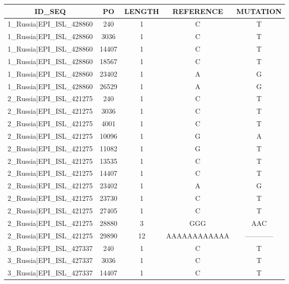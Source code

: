 \documentclass[a4paper,10pt]{article}
\begin{document}
\begin{longtable}{@{}ccccc@{}}
\toprule
\textbf{ID\_SEQ} & \textbf{PO} & \textbf{LENGTH} & \textbf{REFERENCE} & \textbf{MUTATION} \\* \midrule
\endfirsthead
%
\cline{1-5}
\endhead
%
1\_Russia|EPI\_ISL\_428860 & 240 & 1 & C & T \\* \midrule
1\_Russia|EPI\_ISL\_428860 & 3036 & 1 & C & T \\* \midrule
1\_Russia|EPI\_ISL\_428860 & 14407 & 1 & C & T \\* \midrule
1\_Russia|EPI\_ISL\_428860 & 18567 & 1 & C & T \\* \midrule
1\_Russia|EPI\_ISL\_428860 & 23402 & 1 & A & G \\* \midrule
1\_Russia|EPI\_ISL\_428860 & 26529 & 1 & A & G \\* \midrule
2\_Russia|EPI\_ISL\_421275 & 240 & 1 & C & T \\* \midrule
2\_Russia|EPI\_ISL\_421275 & 3036 & 1 & C & T \\* \midrule
2\_Russia|EPI\_ISL\_421275 & 4001 & 1 & C & T \\* \midrule
2\_Russia|EPI\_ISL\_421275 & 10096 & 1 & G & A \\* \midrule
2\_Russia|EPI\_ISL\_421275 & 11082 & 1 & G & T \\* \midrule
2\_Russia|EPI\_ISL\_421275 & 13535 & 1 & C & T \\* \midrule
2\_Russia|EPI\_ISL\_421275 & 14407 & 1 & C & T \\* \midrule
2\_Russia|EPI\_ISL\_421275 & 23402 & 1 & A & G \\* \midrule
2\_Russia|EPI\_ISL\_421275 & 23730 & 1 & C & T \\* \midrule
2\_Russia|EPI\_ISL\_421275 & 27405 & 1 & C & T \\* \midrule
2\_Russia|EPI\_ISL\_421275 & 28880 & 3 & GGG & AAC \\* \midrule
2\_Russia|EPI\_ISL\_421275 & 29890 & 12 & AAAAAAAAAAAA & ------------ \\* \midrule
3\_Russia|EPI\_ISL\_427337 & 240 & 1 & C & T \\* \midrule
3\_Russia|EPI\_ISL\_427337 & 3036 & 1 & C & T \\* \midrule
3\_Russia|EPI\_ISL\_427337 & 14407 & 1 & C & T \\* \midrule

\end{longtable}
\end{document}
